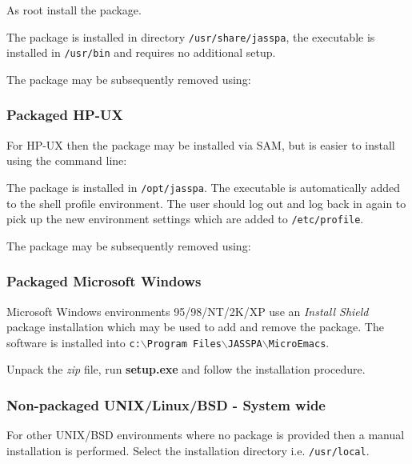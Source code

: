 \documentclass[11pt,a4paper,pdftex]{article}
\begin{document}
  As root install the package.


  The package is installed in directory \texttt{/usr/share/jasspa}, the
  executable is installed in \texttt{/usr/bin} and requires no additional
  setup.

  The package may be subsequently removed using:


\subsubsection{Packaged HP-UX}

  For HP-UX then the package may be installed via SAM, but is easier to
  install using the command line:


  The package is installed in \texttt{/opt/jasspa}. The executable is
  automatically added to the shell profile environment. The user should log
  out and log back in again to pick up the new environment settings which are
  added to \texttt{/etc/profile}.

  The package may be subsequently removed using:


\subsubsection{Packaged Microsoft Windows}

  Microsoft Windows environments 95/98/NT/2K/XP use an \textit{Install Shield}
  package installation which may be used to add and remove the package. The
  software is installed into \texttt{c:$\backslash$Program
  Files\-$\backslash$JASSPA\-$\backslash$Micro\-Emacs}.

  Unpack the \textit{zip} file, run \textbf{setup.exe} and follow the
  installation procedure.

\subsubsection{Non-packaged UNIX/Linux/BSD - System wide}

  For other UNIX/BSD environments where no package is provided then a manual
  installation is performed. Select the installation directory i.e.
  \texttt{/usr/local}.
\end{document}
